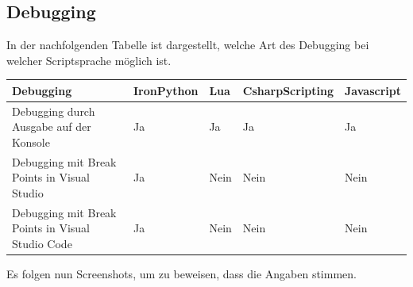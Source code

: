 \subsection{Debugging}
In der nachfolgenden Tabelle ist dargestellt, welche Art des Debugging bei welcher Scriptsprache möglich ist.

\begin{table}[H]
    \begin{tabular}{|p{2.5cm}|p{2.5cm}|p{2.5cm}|p{2.5cm}|p{2.5cm}|}
        \hline
        Debugging & IronPython & Lua & CsharpScripting & Javascript\\ \hline
        Debugging durch Ausgabe auf der Konsole & Ja & Ja & Ja & Ja \\ \hline
        Debugging mit Break Points in Visual Studio & Ja & Nein & Nein & Nein\\ \hline
        Debugging mit Break Points in Visual Studio Code & Ja & Nein & Nein & Nein \\ \hline
    \end{tabular}
\end{table}

Es folgen nun Screenshots, um zu beweisen, dass die Angaben stimmen.

